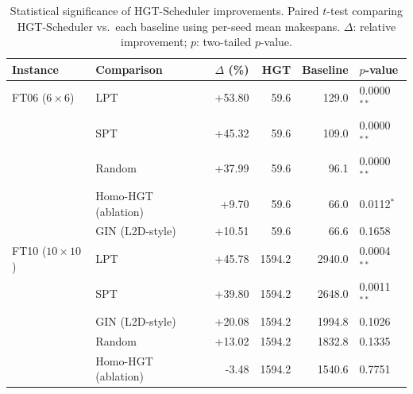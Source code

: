 \begin{table}[t]
  \centering
  \small
  \caption{%
    Statistical significance of HGT-Scheduler improvements.
    Paired $t$-test comparing HGT-Scheduler vs.\ each baseline
    using per-seed mean makespans.
    $\Delta$: relative improvement; $p$: two-tailed $p$-value.
  }
  \label{tab:stat_tests}
  \begin{tabular}{llrrrl}
    \toprule
    \textbf{Instance} & \textbf{Comparison} & $\Delta$ (\%) & \textbf{HGT} & \textbf{Baseline} & $p$-value \\
    \midrule
    FT06 ($6\times6$) & LPT & +53.80 & 59.6 & 129.0 & 0.0000$^{**}$ \\
     & SPT & +45.32 & 59.6 & 109.0 & 0.0000$^{**}$ \\
     & Random & +37.99 & 59.6 & 96.1 & 0.0000$^{**}$ \\
     & Homo-HGT (ablation) & +9.70 & 59.6 & 66.0 & 0.0112$^{*}$ \\
     & GIN (L2D-style) & +10.51 & 59.6 & 66.6 & 0.1658 \\
    \midrule
    FT10 ($10\times10$) & LPT & +45.78 & 1594.2 & 2940.0 & 0.0004$^{**}$ \\
     & SPT & +39.80 & 1594.2 & 2648.0 & 0.0011$^{**}$ \\
     & GIN (L2D-style) & +20.08 & 1594.2 & 1994.8 & 0.1026 \\
     & Random & +13.02 & 1594.2 & 1832.8 & 0.1335 \\
     & Homo-HGT (ablation) & -3.48 & 1594.2 & 1540.6 & 0.7751 \\
    \bottomrule
  \end{tabular}
\end{table}